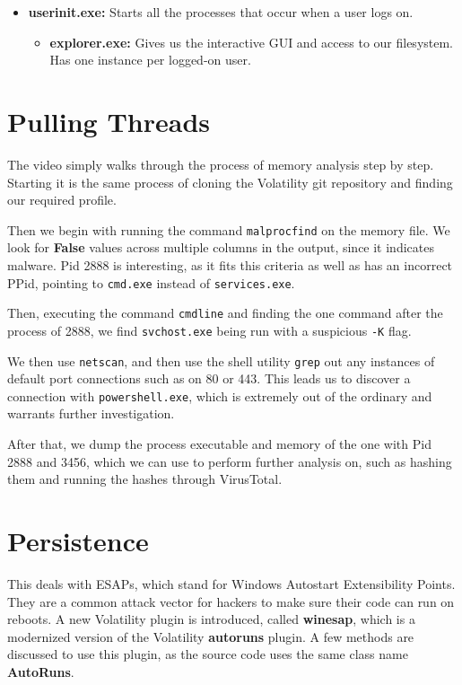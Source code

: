 \documentclass{article}
\begin{document}
\begin{itemize}
\begin{itemize}
        \begin{itemize}
            \item{\textbf{userinit.exe:} Starts all the processes that occur when a user logs on.}
            \begin{itemize}
                \item{\textbf{explorer.exe:} Gives us the interactive GUI and access to our filesystem. Has one instance per logged-on user.}
            \end{itemize}
        \end{itemize}
    \end{itemize}
\end{itemize}

\section{Pulling Threads}

The video simply walks through the process of memory analysis step by step. Starting it is the same process of cloning the Volatility git repository and finding our required profile.

Then we begin with running the command \texttt{malprocfind} on the memory file. We look for \textbf{False} values across multiple columns in the output, since it indicates malware. Pid 2888 is interesting, as it fits this criteria as well as has an incorrect PPid, pointing to \texttt{cmd.exe} instead of \texttt{services.exe}.

Then, executing the command \texttt{cmdline} and finding the one command after the process of 2888, we find \texttt{svchost.exe} being run with a suspicious \texttt{-K} flag.

We then use \texttt{netscan}, and then use the shell utility \texttt{grep} out any instances of default port connections such as on 80 or 443. This leads us to discover a connection with \texttt{powershell.exe}, which is extremely out of the ordinary and warrants further investigation.

After that, we dump the process executable and memory of the one with Pid 2888 and 3456, which we can use to perform further analysis on, such as hashing them and running the hashes through VirusTotal.

\section{Persistence}

This deals with ESAPs, which stand for Windows Autostart Extensibility Points. They are a common attack vector for hackers to make sure their code can run on reboots. A new Volatility plugin is introduced, called \textbf{winesap}, which is a modernized version of the Volatility \textbf{autoruns} plugin. A few methods are discussed to use this plugin, as the source code uses the same class name \textbf{AutoRuns}.
\end{document}

